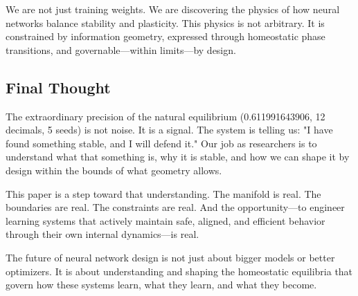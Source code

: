 We are not just training weights. We are discovering the physics of how neural networks balance stability and plasticity. This physics is not arbitrary. It is constrained by information geometry, expressed through homeostatic phase transitions, and governable—within limits—by design.

\subsection{Final Thought}

The extraordinary precision of the natural equilibrium (0.611991643906, 12 decimals, 5 seeds) is not noise. It is a signal. The system is telling us: "I have found something stable, and I will defend it." Our job as researchers is to understand what that something is, why it is stable, and how we can shape it by design within the bounds of what geometry allows.

This paper is a step toward that understanding. The manifold is real. The boundaries are real. The constraints are real. And the opportunity—to engineer learning systems that actively maintain safe, aligned, and efficient behavior through their own internal dynamics—is real.

The future of neural network design is not just about bigger models or better optimizers. It is about understanding and shaping the homeostatic equilibria that govern how these systems learn, what they learn, and what they become.
